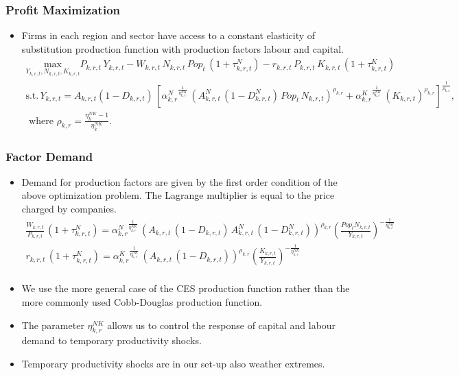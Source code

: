 \documentclass[11pt,aspectratio=169]{beamer}
\begin{document}
\begin{frame}
\frametitle{Profit Maximization}
\scriptsize
\begin{itemize}
\item Firms in each region and sector have access to a constant elasticity of substitution production function with production factors labour and capital.
\begin{align*}
\underset{Y_{k,r,t}, N_{k,r,t}, K_{k,r,t}}{\mathrm{max}} P_{k,r,t} \, Y_{k,r,t} - W_{k,r,t} \, N_{k,r,t} \, Pop_{t} \, (1 + \tau^{N}_{k,r,t}) - r_{k,r,t} \, P_{k,r,t} \, K_{k,r,t} \, (1 + \tau^{K}_{k,r,t})\nonumber \\ 
\mbox{s.t.} \, Y_{k,r,t} = A_{k,r,t} (1 - D_{k,r,t}) \, \left[{\alpha^{N}_{k,r}}^{\frac{1}{\eta^{NK}_{k,r}}} \, \left( A^{N}_{k,r,t} \, (1 - D^{N}_{k,r,t}) \, Pop_{t} \, N_{k,r,t}\right)^{\rho_{k,r}} + {\alpha^{K}_{k,r}}^{\frac{1}{\eta^{NK}_{k,r}}} \, \left(K_{k,r,t}\right)^{\rho_{k,r}}\right]^{\frac{1}{\rho_{k,r}}}, \nonumber \\
\mbox{ where } \rho_{k,r} = \frac{\eta^{NK}_{k} - 1}{\eta^{NK}_{k}}.
\end{align*}
\end{itemize}
\end{frame}


\begin{frame}
\frametitle{Factor Demand}
\scriptsize
\begin{itemize}
\item Demand for production factors are given by the first order condition of the above optimization problem. The Lagrange multiplier is equal to the price charged by companies. 
\begin{align*}
\frac{W_{k,r,t}}{P_{k,r,t}}  \, (1 + \tau^{N}_{k,r,t}) = {\alpha^{N}_{k,r}}^{\frac{1}{\eta^{NK}_{k,r}}} \, \left(A_{k,r,t} \, (1 - D_{k,r,t}) \, A^N_{k,r,t} \, (1 - D^N_{k,r,t})\right)^{\rho_{k,r}} \left(\frac{Pop_{t} N_{k,r,t}}{Y_{k,r,t}}\right)^{-\frac{1}{\eta^{NK}_{k,r}}} \nonumber \\ 
r_{k,r,t} \, (1 + \tau^{K}_{k,r,t}) = {\alpha^{K}_{k,r}}^{\frac{1}{\eta^{NK}_{k,r}}} \, \left(A_{k,r,t} \, (1 - D_{k,r,t})\right)^{\rho_{k,r}}\left(\frac{K_{k,r,t}}{Y_{k,r,t}} \right)^{-\frac{1}{\eta^{NK}_{k,r}}} \\ 
\end{align*}
\item We use the more general case of the CES production function rather than the more commonly used Cobb-Douglas production function. 
\item The parameter $\eta^{NK}_{k,r}$ allows us to control the response of capital and labour demand to temporary productivity shocks. 
\item Temporary productivity shocks are in our set-up also weather extremes. 
\end{itemize}
\end{frame}
\end{document}
